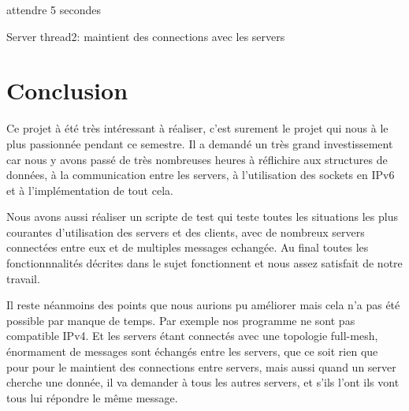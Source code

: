 \documentclass[a4paper,11pt,DIV=12]{scrreprt}
\begin{document}
    \begin{algorithm}
        \begin{algorithmic}[H]
                    \ENDIF
                \ENDWHILE
                \STATE attendre 5 secondes
            \ENDWHILE
        \end{algorithmic}
        \caption{Server thread2: maintient des connections avec les servers}
        \label{alg:server} 
    \end{algorithm}

    \chapter{Conclusion}

    Ce projet à été très intéressant à réaliser, c'est surement le projet qui
    nous à le plus passionnée pendant ce semestre. Il a demandé un très grand
    investissement car nous y avons passé de très nombreuses heures à réflichire
    aux structures de données, à la communication entre les servers, à
    l'utilisation des sockets en IPv6 et à l'implémentation de tout cela.

    Nous avons aussi réaliser un scripte de test qui teste toutes les
    situations les plus courantes d'utilisation des servers et des clients,
    avec de nombreux servers connectées entre eux et de multiples messages
    echangée. Au final toutes les fonctionnnalités décrites dans le sujet 
    fonctionnent et nous assez satisfait de notre travail.

    Il reste néanmoins des points que nous aurions pu améliorer mais
    cela n'a pas été possible par manque de temps. Par exemple nos programme
    ne sont pas compatible IPv4. Et les servers étant connectés avec une
    topologie full-mesh, énormament de messages sont échangés entre les
    servers, que ce soit rien que  pour pour le maintient des connections entre
    servers, mais aussi quand un server cherche une donnée, il va demander à
    tous les autres servers, et s'ils l'ont ils vont tous lui répondre le même
    message.

\end{document}
